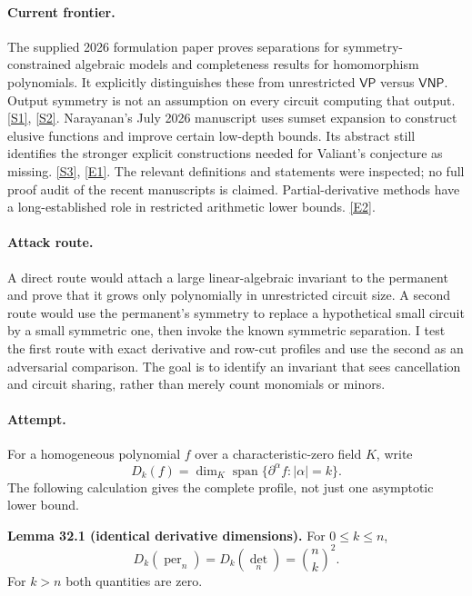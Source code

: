 \documentclass[11pt,a4paper]{article}
\newcommand{\sref}[2]{\hyperlink{source:#1:#2}{[S#2]}}
\newcommand{\eref}[2]{\hyperlink{extra:#1:#2}{[E#2]}}
\numberwithin{equation}{section}
\begin{document}
\paragraph{Current frontier.}
The supplied 2026 formulation paper proves separations for symmetry-constrained
algebraic models and completeness results for homomorphism polynomials. It
explicitly distinguishes these from unrestricted $\mathsf{VP}$ versus
$\mathsf{VNP}$. Output symmetry is not an assumption on every circuit
computing that output. \sref{32}{1}, \sref{32}{2}.
Narayanan's July 2026 manuscript uses sumset expansion to construct elusive
functions and improve certain low-depth bounds. Its abstract still identifies
the stronger explicit constructions needed for Valiant's conjecture as
missing. \sref{32}{3}, \eref{32}{1}. The relevant definitions and statements
were inspected; no full proof audit of the recent manuscripts is claimed.
Partial-derivative methods have a long-established role in restricted
arithmetic lower bounds. \eref{32}{2}.

\paragraph{Attack route.}
A direct route would attach a large linear-algebraic invariant to the
permanent and prove that it grows only polynomially in unrestricted circuit
size. A second route would use the permanent's symmetry to replace a
hypothetical small circuit by a small symmetric one, then invoke the known
symmetric separation. I test the first route with exact derivative and
row-cut profiles and use the second as an adversarial comparison. The goal
is to identify an invariant that sees cancellation and circuit sharing,
rather than merely count monomials or minors.

\paragraph{Attempt.}
For a homogeneous polynomial $f$ over a characteristic-zero field $K$, write
\[
 D_k(f)=\dim_K\operatorname{span}\{\partial^\alpha f:|\alpha|=k\}.
\]
The following calculation gives the complete profile, not just one
asymptotic lower bound.

\textbf{Lemma 32.1 (identical derivative dimensions).}
For $0\le k\le n$,
\begin{equation}\label{r32:derivatives}
 D_k(\operatorname{per}_n)=D_k(\det_n)=\binom nk^2.
\end{equation}
For $k>n$ both quantities are zero.
\end{document}

